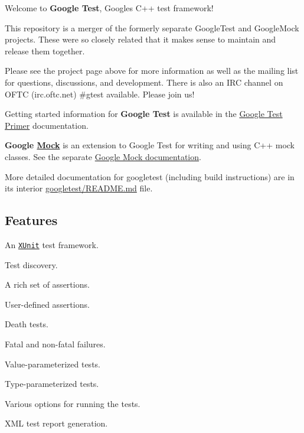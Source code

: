 \href{https://travis-ci.org/google/googletest}{\tt } \href{https://ci.appveyor.com/project/BillyDonahue/googletest/branch/master}{\tt }

Welcome to {\bfseries Google Test}, Google\textquotesingle{}s C++ test framework!

This repository is a merger of the formerly separate Google\+Test and Google\+Mock projects. These were so closely related that it makes sense to maintain and release them together.

Please see the project page above for more information as well as the mailing list for questions, discussions, and development. There is also an I\+RC channel on O\+F\+TC (irc.\+oftc.\+net) \#gtest available. Please join us!

Getting started information for {\bfseries Google Test} is available in the \hyperlink{_primer_8md}{Google Test Primer} documentation.

{\bfseries Google \hyperlink{class_mock}{Mock}} is an extension to Google Test for writing and using C++ mock classes. See the separate \hyperlink{vendor_2googletest_2googlemock_2readme_8md}{Google Mock documentation}.

More detailed documentation for googletest (including build instructions) are in its interior \hyperlink{vendor_2googletest_2readme_8md}{googletest/\+R\+E\+A\+D\+ME.md} file.

\subsection*{Features}


\begin{DoxyItemize}
\item An \href{https://en.wikipedia.org/wiki/XUnit}{\tt X\+Unit} test framework.
\item Test discovery.
\item A rich set of assertions.
\item User-\/defined assertions.
\item Death tests.
\item Fatal and non-\/fatal failures.
\item Value-\/parameterized tests.
\item Type-\/parameterized tests.
\item Various options for running the tests.
\item X\+ML test report generation.
\end{DoxyItemize}

